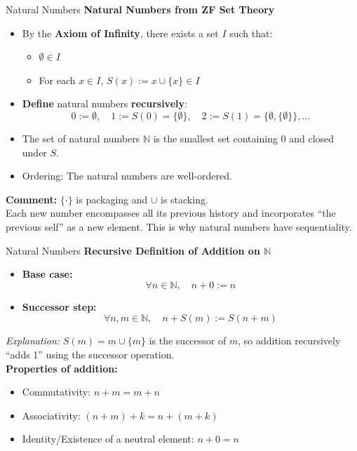 \documentclass[dvipsnames]{beamer}
\theoremstyle{plain}
\theoremstyle{definition}
\begin{document}
\begin{frame}{Natural Numbers}
\textbf{Natural Numbers from ZF Set Theory}

\begin{itemize}
    \item By the \textbf{Axiom of Infinity}, there exists a set $I$ such that:
    \begin{itemize}
        \item $\emptyset \in I$
        \item For each $x \in I$, $S(x) := x \cup \{x\} \in I$
    \end{itemize}
    \item \textbf{Define} natural numbers \textbf{recursively}:
    \[
        0 := \emptyset, \quad 1 := S(0) = \{\emptyset\}, \quad 2 := S(1) = \{\emptyset, \{\emptyset\}\}, \dots
    \]
    \item The set of natural numbers $\mathbb{N}$ is the smallest set containing $0$ and closed under $S$.
    \item Ordering: The natural numbers are well-ordered.
\end{itemize}
\vspace{0.5em}
\textbf{Comment:}
$\{\cdot\}$ is packaging and $\cup$ is stacking. \\
Each new number encompasses all its previous history and incorporates ``the previous self'' as a new element. This is why natural numbers have sequentiality.
\end{frame}

\begin{frame}{Natural Numbers}
\textbf{Recursive Definition of Addition on $\mathbb{N}$}

\begin{itemize}
    \item \textbf{Base case:} 
    \[
        \forall n \in \mathbb{N}, \quad n + 0 := n
    \]
    \item \textbf{Successor step:} 
    \[
        \forall n,m \in \mathbb{N}, \quad n + S(m) := S(n + m)
    \]
\end{itemize}
\textit{Explanation:} $S(m) = m \cup \{m\}$ is the successor of $m$, so addition recursively “adds 1” using the successor operation. \\
\vspace{0.5em}
\textbf{Properties of addition:}
\begin{itemize}
    \item Commutativity: $n + m = m + n$
    \item Associativity: $(n + m) + k = n + (m + k)$
    \item Identity/Existence of a neutral element: $n + 0 = n$     
\end{itemize}
\end{frame}
\end{document}
